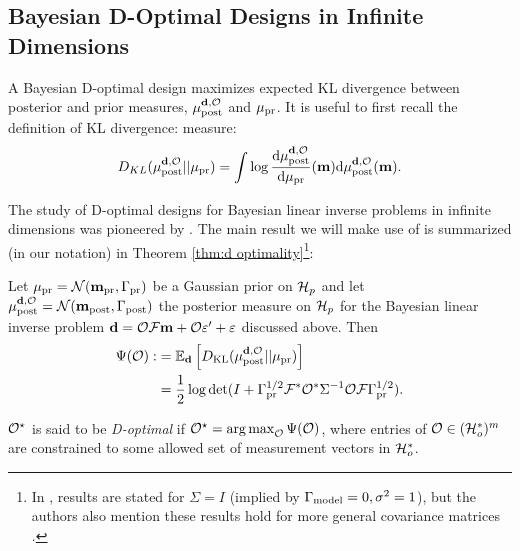 \subsection{Bayesian D-Optimal Designs in Infinite Dimensions}\label{subsec:D optimal design} 
A Bayesian D-optimal design maximizes expected KL divergence between
posterior and prior measures, $\mu_{\textup{post}}^{\mathbf{d}, \mathcal{O}}$ and $\mu_{\textup{pr}}$. It is useful to first
recall the definition of KL divergence:%
measure:
$$
D_{KL}(\mu_{\textup{post}}^{\mathbf{d}, \mathcal{O}}||\mu_{\textup{pr}}) = \int \log \frac{\text{\textup{d}} \mu_{\textup{post}}^{\mathbf{d}, \mathcal{O}}}{\text{\textup{d}} \mu_{\textup{pr}}}(\mathbf{m}) \text{\textup{d}} \mu_{\textup{post}}^{\mathbf{d}, \mathcal{O}}(\mathbf{m}).
$$

The study of D-optimal designs for Bayesian linear inverse problems in
infinite dimensions was pioneered by \cite{AlexanderianGloorGhattas14,
  alexanderian2018efficient}. The main result we will make use of is
summarized (in our notation) in Theorem \ref{thm:d optimality}\footnote{In
\cite{AlexanderianGloorGhattas14, alexanderian2018efficient}, results
are stated for $\Sigma=I$ (implied by $\Gamma_{\textup{model}} = 0,\sigma^2=1$), but
the authors also mention these results hold for more general
covariance matrices \cite[p. 681]{AlexanderianGloorGhattas14}.}:


\begin{theorem}\label{thm:d optimality}
  Let $\mu_{\textup{pr}} = \mathcal{N}(\mathbf{m}_{\textup{pr}},\Gamma_{\textup{pr}})$ be a Gaussian prior on $\mathcal{H}_p$
  and let $\mu_{\textup{post}}^{\mathbf{d}, \mathcal{O}} = \mathcal{N}(\mathbf{m}_{\textup{post}},\Gamma_{\textup{post}})$ the posterior measure
  on $\mathcal{H}_p$ for the Bayesian linear inverse problem $\mathbf{d} = \mathcal{O}
  \mathcal{F}\mathbf{m} + \mathcal{O} \varepsilon' + \varepsilon$ discussed above. Then
  \begin{align}\label{eq:objective}
    \begin{split}
      \tar( \obs) :&= \mathbb{E}_{\data}\left [ D_{\text{KL}} (\post || \pr ) \right ] \\
      &= \frac12 \log \det 
      ( I + \prcov^{1/2}  \fwd ^* \obs^* \Sigma^{-1} \obs \fwd \prcov^{1/2}).
    \end{split}
  \end{align}
\end{theorem}
\begin{definition}\label{def:d optimality}
  $\mathcal{O}^{\star}$ is said to be \emph{D-optimal} if $\mathcal{O}^{\star} =
  \operatorname*{arg\,max}_{\mathcal{O}} \Psi(\mathcal{O})$, where entries of $\mathcal{O} \in (\mathcal{H}_o^*)^m$ are constrained to
  some allowed set of measurement vectors in $\mathcal{H}_o^*$.
\end{definition}

